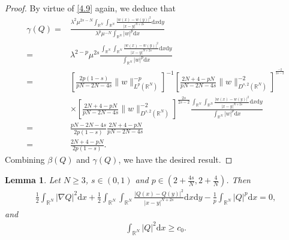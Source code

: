 \documentclass[12pt,a4paper,reqno]{amsart}
\numberwithin{equation}{section}
\newtheorem{lemma}{Lemma}[section]
\begin{document}
\begin{proof}
By virtue of \eqref{4.9} again, we deduce that
\begin{equation*}
\begin{aligned}
\gamma(Q)
=&\frac{\lambda^{2}
\mu^{2s-N}\int_{\mathbb{R}^{N}}\int_{\mathbb{R}^{N}}\frac{|w(x)-w(y)|^{2}}{|x-y|^{N+2s}}\mathrm{d}x\mathrm{d}y}
{\lambda^{p}
\mu^{-N}
\int_{\mathbb{R}^{N}}|w|^{p}\mathrm{d}x}\\
=&
\lambda^{2-p}
\mu^{2s}
\frac{\int_{\mathbb{R}^{N}}\int_{\mathbb{R}^{N}}\frac{|w(x)-w(y)|^{2}}{|x-y|^{N+2s}}\mathrm{d}x\mathrm{d}y}
{\int_{\mathbb{R}^{N}}|w|^{p}\mathrm{d}x}\\
=&
\left[\frac{2p(1-s)}{pN-2N-4s}
\|w\|_{L^{p}(\mathbb{R}^{N})}^{-p}\right]^{-1}
\left[\frac{2N+4-pN}{pN-2N-4s}
\|w\|_{D^{s,2}(\mathbb{R}^{N})}^{-2}
\right]^{^{\frac{-2}{2s-2}}}\\
&\times
\left[\frac{2N+4-pN}{pN-2N-4s}
\|w\|_{D^{s,2}(\mathbb{R}^{N})}^{-2}
\right]^{\frac{2s}{2s-2}}
\frac{\int_{\mathbb{R}^{N}}\int_{\mathbb{R}^{N}}\frac{|w(x)-w(y)|^{2}}{|x-y|^{N+2s}}\mathrm{d}x\mathrm{d}y}
{\int_{\mathbb{R}^{N}}|w|^{p}\mathrm{d}x}\\
=&
\frac{pN-2N-4s}{2p(1-s)}\frac{2N+4-pN}{pN-2N-4s}\\
=&\frac{2N+4-pN}{2p(1-s)}.
\end{aligned}
\end{equation*}
Combining $\beta(Q)$ and $\gamma(Q)$, we have the desired result.
\end{proof}

\begin{lemma}\label{Lemma5.3}
Let $N\geqslant 3$, $s\in(0,1)$ and $p \in(2+\frac{4s}{N},2+\frac{4}{N})$.
Then
\begin{equation*}
\begin{aligned}
\frac{1}{2}
\int_{\mathbb{R}^{N}}
|\nabla Q|^{2}
\mathrm{d}x
+\frac{1}{2}
\int_{\mathbb{R}^{N}}
\int_{\mathbb{R}^{N}}
\frac{|Q(x)-Q(y)|^{2}}{|x-y|^{N+2s}}
\mathrm{d}x
\mathrm{d}y
-\frac{1}{p}
\int_{\mathbb{R}^{N}}
|Q|^{p}
\mathrm{d}x=0,
\end{aligned}
\end{equation*}
and
\begin{equation*}
\begin{aligned}
\int_{\mathbb{R}^{N}}
|Q|^{2}
\mathrm{d}x\geqslant c_{0}.
\end{aligned}
\end{equation*}
\end{lemma}
\end{document}
